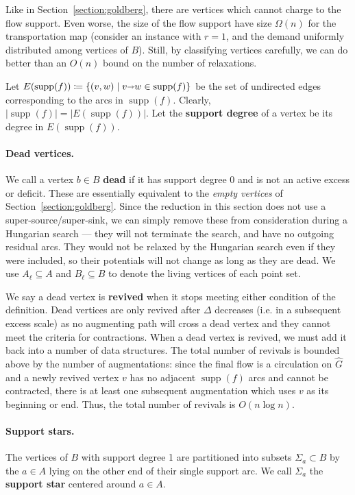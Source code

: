\documentclass[11pt]{article}
\def\abs#1{\mathopen| #1 \mathclose|}		%
\def\arcto{\mathord\shortrightarrow}
\def\arc#1#2{#1\arcto#2}
\def\supp{\operatorname{supp}}
\theoremstyle{plain}
\numberwithin{figure}{section}
\def\EMPH#1{\textbf{\boldmath #1}}
\begin{document}
Like in Section~\ref{section:goldberg}, there are vertices which cannot charge
to the flow support.
Even worse, the size of the flow support have size $\Omega(n)$ for the
transportation map (consider an instance with $r=1$, and the demand uniformly
distributed among vertices of $B$).
Still, by classifying vertices carefully, we can do better than an $O(n)$ bound
on the number of relaxations.

Let $E(\supp(f)) \coloneqq \{(v, w) \mid \arc vw \in \supp(f)\}$ be the set
of undirected edges corresponding to the arcs in $\supp(f)$.
Clearly, $\abs{\supp(f)} = \abs{E(\supp(f))}$.
Let the \EMPH{support degree} of a vertex be its degree in $E(\supp(f))$.

\paragraph{Dead vertices.}
We call a vertex $b \in B$ \EMPH{dead} if it has support degree 0 and is not an
active excess or deficit.
These are essentially equivalent to the \emph{empty vertices} of
Section~\ref{section:goldberg}.
Since the reduction in this section does not use a super-source/super-sink,
we can simply remove these from consideration during a Hungarian search ---
they will not terminate the search, and have no outgoing residual arcs.
They would not be relaxed by the Hungarian search even if they were included,
so their potentials will not change as long as they are dead.
We use $A_\ell \subseteq A$ and $B_\ell \subseteq B$ to denote the living
vertices of each point set.

We say a dead vertex is \EMPH{revived} when it stops meeting either condition
of the definition.
Dead vertices are only revived after $\Delta$ decreases (i.e. in a
subsequent excess scale) as no augmenting path will cross a dead vertex and
they cannot meet the criteria for contractions.
When a dead vertex is revived, we must add it back into a number of data
structures.
The total number of revivals is bounded above by the number of augmentations:
since the final flow is a circulation on $\hat{G}$ and a newly revived vertex
$v$ has no adjacent $\supp(f)$ arcs and cannot be contracted, there is at least
one subsequent augmentation which uses $v$ as its beginning or end.
Thus, the total number of revivals is $O(n\log n)$.

\paragraph{Support stars.}
The vertices of $B$ with support degree 1 are partitioned into subsets
$\Sigma_a \subset B$ by the $a \in A$ lying on the other end of their single
support arc.
We call $\Sigma_a$ the \EMPH{support star} centered around $a \in A$.
\end{document}
